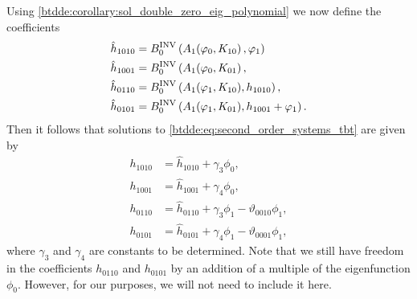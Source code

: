 Using \cref{btdde:corollary:sol_double_zero_eig_polynomial} we now define the coefficients
\begin{align}
    \hat h_{1010} & = B^{\mathrm{INV}}_{0} \left(A_1(\varphi_0,K_{10}\right),\varphi_1)\\
    \hat h_{1001} & = B^{\mathrm{INV}}_{0} \left(A_1(\varphi_0,K_{01}\right),\\
    \hat h_{0110} & = B^{\mathrm{INV}}_{0} \left(A_1(\varphi_1,K_{10}),h_{1010}\right),\\
    \hat h_{0101} & = B^{\mathrm{INV}}_{0} \left(A_1(\varphi_1,K_{01}),h_{1001} + \varphi_1\right).
\end{align}
Then it follows that solutions to \cref{btdde:eq:second_order_systems_tbt} are given by
\begin{equation}
\label{btdde:eq:seconder_order_coefficients_phase_space_tbt}
\begin{aligned}
    h_{1010} &= \hat h_{1010} + \gamma_3 \phi_0, \\
    h_{1001} &= \hat h_{1001} + \gamma_4 \phi_0, \\
    h_{0110} &= \hat h_{0110} + \gamma_3 \phi_1 - \vartheta_{0010} \phi_1, \\
    h_{0101} &= \hat h_{0101} + \gamma_4 \phi_1 - \vartheta_{0001} \phi_1,
\end{aligned}
\end{equation}
where $\gamma_3$ and $\gamma_4$ are constants to be determined. Note that we
still have freedom in the coefficients $h_{0110}$ and $h_{0101}$ by an addition of
a multiple of the eigenfunction $\phi_0$. However, for our purposes, we will 
not need to include it here.


